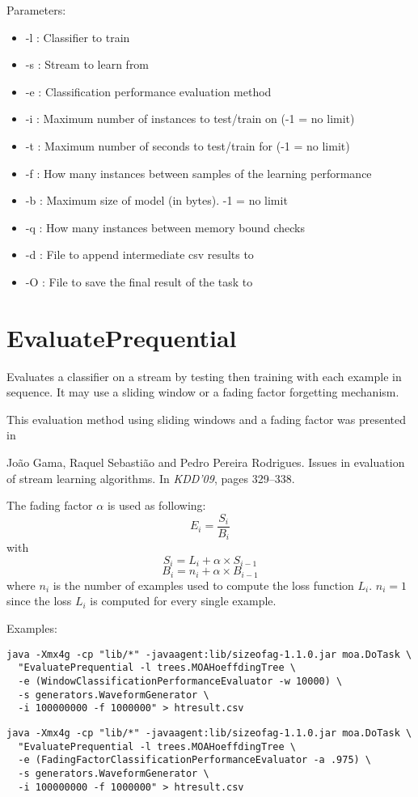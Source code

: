 \documentclass[a4paper,12pt,twoside]{book}
\begin{document}
Parameters:
\begin{itemize}
\item -l : Classifier to train
\item -s : Stream to learn from
\item -e : Classification performance evaluation method
\item -i : Maximum number of instances to test/train on  (-1 = no limit)
\item -t : Maximum number of seconds to test/train for (-1 = no limit)
\item -f : How many instances between samples of the learning performance
\item -b : Maximum size of model (in bytes). -1 = no limit
\item -q : How many instances between memory bound checks
\item -d : File to append intermediate csv results to
\item -O : File to save the final result of the task to
\end{itemize}



\section{EvaluatePrequential}
 Evaluates a classifier on a stream by testing then training with each example in sequence.
It may use a sliding window or a fading factor forgetting mechanism.

This evaluation method using sliding windows and a fading factor was presented in

\begin{itemize}
Jo{\~a}o Gama, Raquel Sebasti{\~a}o and Pedro Pereira Rodrigues.
\newblock Issues in evaluation of stream learning algorithms.
\newblock In {\em KDD'09}, pages 329--338.\end{itemize}

The fading factor $\alpha$ is used as following:
$$E_i = \frac{S_i} {B_i}$$
with
 $$S_i = L_i + \alpha \times S_{i-1}$$ $$B_i = n_i + \alpha \times B_{i-1}$$
where $n_i$ is the number of examples used to compute the loss function $L_i$.
$n_i = 1$ since the loss $L_i$ is computed for every single example.


Examples:
\begin{footnotesize}\begin{verbatim}
java -Xmx4g -cp "lib/*" -javaagent:lib/sizeofag-1.1.0.jar moa.DoTask \
  "EvaluatePrequential -l trees.MOAHoeffdingTree \
  -e (WindowClassificationPerformanceEvaluator -w 10000) \
  -s generators.WaveformGenerator \
  -i 100000000 -f 1000000" > htresult.csv
\end{verbatim}
\begin{verbatim}
java -Xmx4g -cp "lib/*" -javaagent:lib/sizeofag-1.1.0.jar moa.DoTask \
  "EvaluatePrequential -l trees.MOAHoeffdingTree \
  -e (FadingFactorClassificationPerformanceEvaluator -a .975) \
  -s generators.WaveformGenerator \
  -i 100000000 -f 1000000" > htresult.csv
\end{verbatim}

\end{footnotesize}
\end{document}
